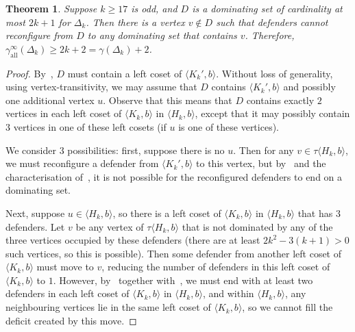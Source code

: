 \documentclass{amsart}
\newtheorem{thm}{Theorem}[section]
\theoremstyle{remark}
\theoremstyle{definition}
\newcommand{\etdom}{\gamma_{\mathrm{all}}^\infty}
\begin{document}
\begin{thm}\label{cant-defend}
Suppose $k \ge 17$ is odd, and $D$ is a dominating set of cardinality at most $2k+1$ for $\Delta_k$. Then there is a vertex $v \notin D$ such that defenders cannot reconfigure from $D$ to any dominating set that contains $v$. Therefore, $\etdom(\Delta_k)\ge 2k+2=\gamma(\Delta_k)+2$.
\end{thm}

\begin{proof}
By~, $D$ must contain a left coset of $\langle K_k',b\rangle$.
    Without loss of generality, using vertex-transitivity, we may assume that $D$ contains $\langle K_k',b\rangle$ and possibly one additional vertex $u$. Observe that this means that $D$ contains exactly $2$ vertices in each left coset of $\langle K_k,b\rangle$ in $\langle H_k,b\rangle$, except that it may possibly contain $3$ vertices in one of these left cosets (if $u$ is one of these vertices).

    We consider $3$ possibilities: first, suppose there is no $u$. Then for any $v \in \tau\langle H_k,b \rangle$, we must reconfigure a defender from $\langle K_k',b \rangle$ to this vertex, but by~ and the characterisation of~, it is not possible for the reconfigured defenders to end on a dominating set.

    Next, suppose $u \in \langle H_k,b\rangle$, so there is a left coset of $\langle K_k,b\rangle$ in $\langle H_k,b\rangle$ that has $3$ defenders. Let $v$ be any vertex of $\tau\langle H_k,b\rangle$ that is not dominated by any of the three vertices occupied by these defenders (there are at least $2k^2-3(k+1)>0$ such vertices, so this is possible). Then some defender from another left coset of $\langle K_k,b\rangle$ must move to $v$, reducing the number of defenders in this left coset of $\langle K_k,b\rangle$ to $1$. However, by~ together with~, we must end with at least two defenders in each left coset of $\langle K_k,b\rangle$ in $\langle H_k,b\rangle$, and within $\langle H_k,b\rangle$, any neighbouring vertices lie in the same left coset of $\langle K_k,b\rangle$, so we cannot fill the deficit created by this move. 


\end{proof}
\end{document}
